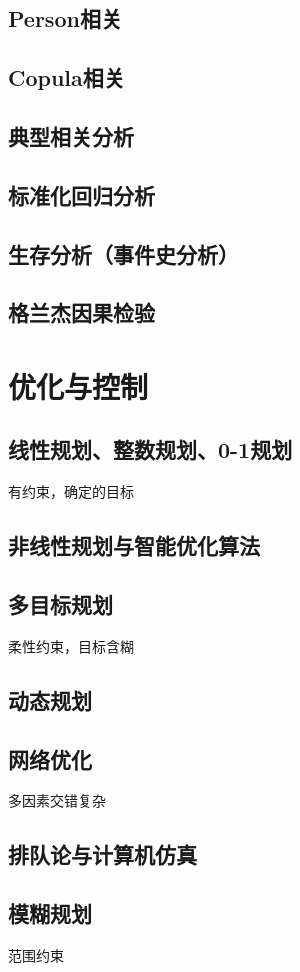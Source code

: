\documentclass[openany]{progbookcn}
\begin{document}
\section{Person相关}
\section{Copula相关}
\section{典型相关分析}
\section{标准化回归分析}
\section{生存分析（事件史分析）}
\section{格兰杰因果检验}
\chapter{优化与控制}
\section{线性规划、整数规划、0-1规划}
有约束，确定的目标
\section{非线性规划与智能优化算法}
\section{多目标规划}
柔性约束，目标含糊
\section{动态规划}

\section{网络优化}
多因素交错复杂
\section{排队论与计算机仿真}
\section{模糊规划}
范围约束
\end{document}
